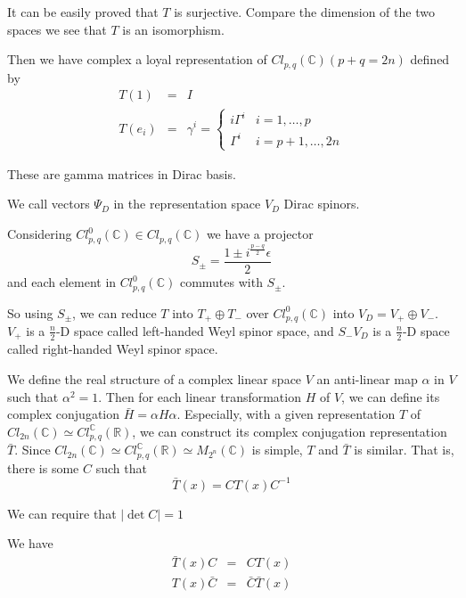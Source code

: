 \documentclass[12pt]{book}
\begin{document}
	It can be easily proved that $T$ is surjective. Compare the dimension of the two spaces we see that $T$ is an isomorphism.
	
	Then we have complex a loyal representation of $Cl_{p,q}(\mathbb C)(p+q=2n)$ defined by
	\begin{eqnarray}
		T(1)&=&I\\
		T(e_i)&=&\gamma^i=\left\{\begin{array}{ll}
			i\Gamma^i & i=1,\dots,p\\
			\Gamma^i & i=p+1,\dots,2n
		\end{array} \right.	
	\end{eqnarray}
	
	These are gamma matrices in Dirac basis.
	
	We call vectors $\Psi_D$ in the representation space $V_D$ Dirac spinors.
	
	Considering $Cl^0_{p,q}(\mathbb C)\in Cl_{p,q}(\mathbb C)$ we have a projector
	\begin{equation}
		S_\pm=\frac{1\pm i^{\frac{p-q}2}\epsilon}2
	\end{equation}
	and each element in $Cl^0_{p,q}(\mathbb C)$ commutes with $S_\pm$.
	
	So using $S_\pm$, we can reduce $T$ into $T_+\oplus T_-$ over $Cl^0_{p,q}(\mathbb C)$ into $V_D=V_+\oplus V_-$. $V_+$ is a $\frac n2$-D space called left-handed Weyl spinor space, and $S_- V_D$ is a $\frac n2$-D space called right-handed Weyl spinor space.
	
	We define the real structure of a complex linear space $V$ an anti-linear map $\alpha$ in $V$ such that $\alpha^2=1$. Then for each linear transformation $H$ of $V$, we can define its complex conjugation $\bar H=\alpha H\alpha$. Especially, with a given representation $T$ of $Cl_{2n}(\mathbb C)\simeq Cl_{p,q}^{\mathbb C}(\mathbb R)$, we can construct its complex conjugation representation $\bar T$. Since $Cl_{2n}(\mathbb C)\simeq Cl_{p,q}^{\mathbb C}(\mathbb R)\simeq M_{2^n}(\mathbb C)$ is simple, $T$ and $\bar T$ is similar. That is, there is some $C$ such that 
	\begin{equation}
		\bar T(x)=CT(x)C^{-1}
	\end{equation}
	
	We can require that $|\det C|=1$
	
	We have
	\begin{eqnarray}
		\bar T(x)C&=&CT(x)\\
		T(x)\bar C&=&\bar C\bar T(x)
	\end{eqnarray}
	
\end{document}
